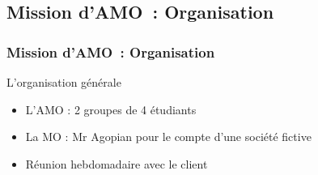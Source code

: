 \subsection{Mission d'AMO~: Organisation}
\begin{frame}
	\frametitle{Mission d'AMO~: Organisation} \pause
	\begin{block}{L'organisation générale} \pause
	\begin{itemize}
	\item L'AMO : 2 groupes de 4 étudiants \pause
	\item La MO : Mr Agopian pour le compte d'une société fictive \mo \pause
	\item Réunion hebdomadaire avec le client
	\end{itemize}
	\end{block}
\end{frame}


